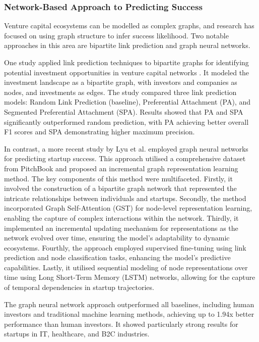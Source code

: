 \documentclass[a4paper, oneside]{discothesis}
\begin{document}
\subsubsection{Network-Based Approach to Predicting Success}

Venture capital ecosystems can be modelled as complex graphs, and research has focused on using graph structure to infer success likelihood. Two notable approaches in this area are bipartite link prediction and graph neural networks.

One study applied link prediction techniques to bipartite graphs for identifying potential investment opportunities in venture capital networks \cite{predictVCbipartite}. It modeled the investment landscape as a bipartite graph, with investors and companies as nodes, and investments as edges. The study compared three link prediction models: Random Link Prediction (baseline), Preferential Attachment (PA), and Segmented Preferential Attachment (SPA). Results showed that PA and SPA significantly outperformed random prediction, with PA achieving better overall F1 scores and SPA demonstrating higher maximum precision.

In contrast, a more recent study by Lyu et al. \cite{lyu2023graph} employed graph neural networks for predicting startup success. This approach utilised a comprehensive dataset from PitchBook and proposed an incremental graph representation learning method. The key components of this method were multifaceted. Firstly, it involved the construction of a bipartite graph network that represented the intricate relationships between individuals and startups. Secondly, the method incorporated Graph Self-Attention (GST) for node-level representation learning, enabling the capture of complex interactions within the network. Thirdly, it implemented an incremental updating mechanism for representations as the network evolved over time, ensuring the model's adaptability to dynamic ecosystems. Fourthly, the approach employed supervised fine-tuning using link prediction and node classification tasks, enhancing the model's predictive capabilities. Lastly, it utilised sequential modeling of node representations over time using Long Short-Term Memory (LSTM) networks, allowing for the capture of temporal dependencies in startup trajectories.

The graph neural network approach outperformed all baselines, including human investors and traditional machine learning methods, achieving up to 1.94x better performance than human investors. It showed particularly strong results for startups in IT, healthcare, and B2C industries.
\end{document}
